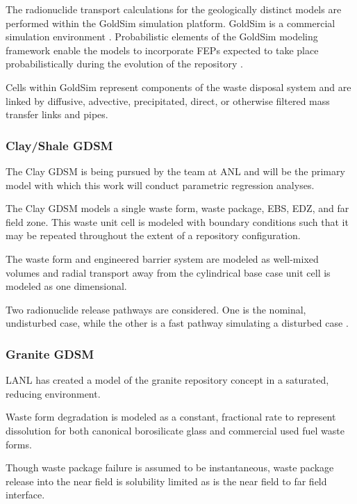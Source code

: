 The radionuclide transport calculations for the geologically distinct models 
are performed within the GoldSim simulation platform. GoldSim is a commercial 
simulation environment \cite{kossik_goldsim_2006}.
Probabilistic elements of the GoldSim modeling framework enable the models to 
incorporate \gls{FEPs} expected to take place probabilistically during the 
evolution of the repository \cite{clayton_generic_2011}.  

Cells within GoldSim represent components of the waste disposal system and
are linked by diffusive, advective, precipitated, direct, or  otherwise filtered
mass transfer links and pipes. 

\subsubsection{Clay/Shale GDSM}

The Clay \gls{GDSM} is being pursued by the team at \gls{ANL} and will be 
the primary model with which this work will conduct parametric regression 
analyses. 

The Clay \gls{GDSM} models a single waste form, waste package, \gls{EBS}, 
\gls{EDZ}, and far field zone. This waste unit cell is modeled with boundary 
conditions such that it may be repeated throughout the extent of a repository 
configuration. 

The waste form and engineered barrier system are modeled as well-mixed volumes 
and radial transport away from the cylindrical base case unit cell is modeled as  
one dimensional.

Two radionuclide release pathways are considered. One is the nominal, undisturbed 
case, while the other is a fast pathway simulating a disturbed case
\cite{clayton_generic_2011}.


\subsubsection{Granite GDSM}

\gls{LANL} has created a model of the granite repository concept  
in a saturated, reducing environment.

Waste form degradation is modeled as a constant, fractional rate to represent 
dissolution for both canonical borosilicate glass and commercial used fuel 
waste forms.  

Though waste package failure is assumed to be instantaneous,
waste package release into the near field is solubility limited as is the near 
field to far field interface. 

